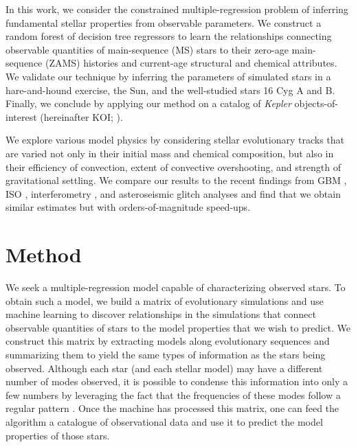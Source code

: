 \documentclass[manuscript,linenumbers]{aastex6}
\begin{document}
In this work, we consider the constrained multiple-regression problem of inferring fundamental stellar properties from observable parameters. We construct a random forest of decision tree regressors to learn the relationships connecting observable quantities of main-sequence (MS) stars to their zero-age main-sequence (ZAMS) histories and current-age structural and chemical attributes. We validate our technique by inferring the parameters of simulated stars in a hare-and-hound exercise, the Sun, and the well-studied stars 16 Cyg A and B. Finally, we conclude by applying our method on a catalog of \emph{Kepler} objects-of-interest (hereinafter KOI; \citealt{2016MNRAS.456.2183D}).  


We explore various model physics by considering stellar evolutionary tracks that are varied not only in their initial mass and chemical composition, but also in their efficiency of convection, extent of convective overshooting, and strength of gravitational settling. We compare our results to the recent findings from GBM \citep{2015MNRAS.452.2127S}, ISO \citep{2015ApJ...811L..37M}, interferometry \citep{2013MNRAS.433.1262W}, and asteroseismic glitch analyses \citep{2014ApJ...790..138V} and find that we obtain similar estimates but with orders-of-magnitude speed-ups. 


\section{Method} \label{sec:Method} 
We seek a multiple-regression model capable of characterizing observed stars. To obtain such a model, we build a matrix of evolutionary simulations and use machine learning to discover relationships in the simulations that connect observable quantities of stars to the model properties that we wish to predict. We construct this matrix by extracting models along evolutionary sequences and summarizing them to yield the same types of information as the stars being observed. Although each star (and each stellar model) may have a different number of modes observed, it is possible to condense this information into only a few numbers by leveraging the fact that the frequencies of these modes follow a regular pattern \citep[for a review of solar-like oscillations, see][]{doi:10.1146/annurev-astro-082812-140938}. Once the machine has processed this matrix, one can feed the algorithm a catalogue of observational data and use it to predict the model properties of those stars.
\end{document}
